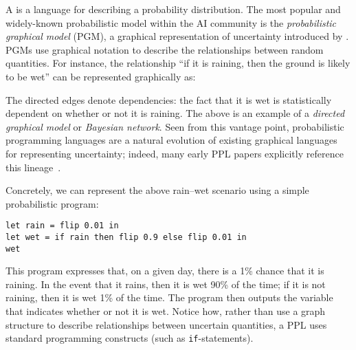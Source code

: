\documentclass{../tufte-handout}
\begin{document}
A  is a language for describing a probability distribution.
The most popular and widely-known probabilistic model within the AI community is
the \emph{probabilistic graphical model} (PGM), a graphical representation of
uncertainty introduced by \citet{pearl1988probabilistic}. PGMs use 
graphical notation to describe the relationships between random quantities. 
For instance, the relationship ``if it is raining, then the ground is likely 
to be wet'' can be represented graphically as:
\begin{center}
\end{center}

The directed edges denote dependencies: the fact that it is wet is statistically 
dependent on whether or not it is raining. The above is an example of a \emph{directed 
graphical model} or \emph{Bayesian network}.
Seen from this vantage point, probabilistic programming languages are a natural
evolution of existing graphical languages for representing uncertainty; indeed,
many early PPL papers explicitly reference this
lineage~\citep{sato1997prism,ramsey2002stochastic,goodman2012church}.


Concretely, we can represent the above rain--wet scenario using a simple
probabilistic program:

\begin{lstlisting}
let rain = flip 0.01 in
let wet = if rain then flip 0.9 else flip 0.01 in
wet
\end{lstlisting}

This program expresses that, on a given day, there is a 1\% chance that it is 
raining. In the event that it rains, then it is wet 90\% of the time; 
if it is not raining, then it is wet 1\% of the time. The program then outputs 
the variable that indicates whether or not it is wet. Notice how, rather than 
use a graph structure to describe relationships between uncertain quantities, 
a PPL uses standard programming constructs (such as \texttt{if}-statements).
\end{document}
